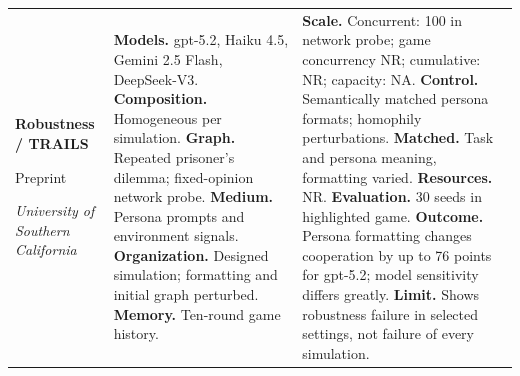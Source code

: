 \begin{longtable}{@{}>{\raggedright\arraybackslash}p{}>{\raggedright\arraybackslash}p{}>{\raggedright\arraybackslash}p{}@{}}
\textbf{Robustness / TRAILS}\par \citep{prev-robustness-audits}\par Preprint\par\emph{University of Southern California} & \textbf{Models.} gpt-5.2, Haiku 4.5, Gemini 2.5 Flash, DeepSeek-V3. \textbf{Composition.} Homogeneous per simulation. \textbf{Graph.} Repeated prisoner's dilemma; fixed-opinion network probe. \textbf{Medium.} Persona prompts and environment signals. \textbf{Organization.} Designed simulation; formatting and initial graph perturbed. \textbf{Memory.} Ten-round game history. & \textbf{Scale.} Concurrent: 100 in network probe; game concurrency NR; cumulative: NR; capacity: NA. \textbf{Control.} Semantically matched persona formats; homophily perturbations. \textbf{Matched.} Task and persona meaning, formatting varied. \textbf{Resources.} NR. \textbf{Evaluation.} 30 seeds in highlighted game. \textbf{Outcome.} Persona formatting changes cooperation by up to 76 points for gpt-5.2; model sensitivity differs greatly. \textbf{Limit.} Shows robustness failure in selected settings, not failure of every simulation. \\
\end{longtable}
\endgroup

